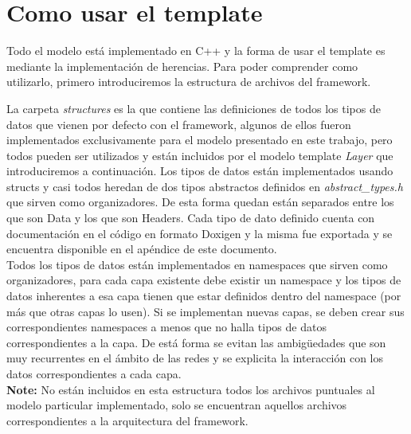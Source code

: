 \documentclass[10pt,a4paper]{article}
\begin{document}
\section{Como usar el template}

Todo el modelo está implementado en C++ y la forma de usar el template es mediante la implementación de herencias. Para poder comprender como utilizarlo, primero introduciremos la estructura de archivos del framework. \\


\medskip

La carpeta \textit{structures} es la que contiene las definiciones de todos los tipos de datos que vienen por defecto con el framework, algunos de ellos fueron implementados exclusivamente para el modelo presentado en este trabajo, pero todos pueden ser utilizados y están incluidos por el modelo template \textit{Layer} que introduciremos a continuación. Los tipos de datos están implementados usando structs y casi todos heredan de dos tipos abstractos definidos en \textit{abstract\_types.h} que sirven como organizadores. De esta forma quedan están separados entre los que son Data y los que son Headers. Cada tipo de dato definido cuenta con documentación en el código en formato Doxigen y la misma fue exportada y se encuentra disponible en el apéndice de este documento. \\

Todos los tipos de datos están implementados en namespaces que sirven como organizadores, para cada capa existente debe existir un namespace y los tipos de datos inherentes a esa capa tienen que estar definidos dentro del namespace (por más que otras capas lo usen). Si se implementan nuevas capas, se deben crear sus correspondientes namespaces a menos que no halla tipos de datos correspondientes a la capa. De está forma se evitan las ambigüedades que son muy recurrentes en el ámbito de las redes y se explicita la interacción con los datos correspondientes a cada capa. \\

\textbf{Note: } No están incluidos en esta estructura todos los archivos puntuales al modelo particular implementado, solo se encuentran aquellos archivos correspondientes a la arquitectura del framework. \\
\end{document}
